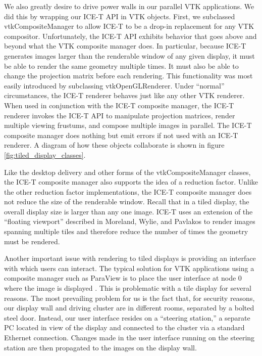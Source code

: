 \documentclass[twocolumn]{article}
\begin{document}
  We also greatly desire to drive power walls in our parallel VTK
  applications.  We did this by wrapping our ICE-T API in VTK objects.
  First, we subclassed vtkCompositeManager to allow ICE-T to be a drop-in
  replacement for any VTK compositor.  Unfortunately, the ICE-T API
  exhibits behavior that goes above and beyond what the VTK composite
  manager does.  In particular, because ICE-T generates images larger than
  the renderable window of any given display, it must be able to render the
  same geometry multiple times.  It must also be able to change the
  projection matrix before each rendering.  This functionality was most
  easily introduced by subclassing vtkOpenGLRenderer.  Under ``normal''
  circumstances, the ICE-T renderer behaves just like any other VTK
  renderer.  When used in conjunction with the ICE-T composite manager, the
  ICE-T renderer invokes the ICE-T API to manipulate projection matrices,
  render multiple viewing frustums, and compose multiple images in
  parallel.  The ICE-T composite manager does nothing but emit errors if
  not used with an ICE-T renderer.  A diagram of how these objects
  collaborate is shown in figure \vref{fig:tiled_display_classes}.

  Like the desktop delivery and other forms of the vtkCompositeManager
  classes, the ICE-T composite manager also supports the idea of a
  reduction factor.  Unlike the other reduction factor implementations, the
  ICE-T composite manager does not reduce the size of the renderable
  window.  Recall that in a tiled display, the overall display size is
  larger than any one image.  ICE-T uses an extension of the ``floating
  viewport'' described in Moreland, Wylie, and Pavlakos \cite{Moreland01}
  to render images spanning multiple tiles and therefore reduce the number
  of times the geometry must be rendered.

  Another important issue with rendering to tiled displays is providing an
  interface with which users can interact.  The typical solution for VTK
  applications using a composite manager such as ParaView is to place the
  user interface at node 0 where the image is displayed \cite{Law01}.  This
  is problematic with a tile display for several reasons.  The most
  prevailing problem for us is the fact that, for security reasons, our
  display wall and driving cluster are in different rooms, separated by a
  bolted steel door.  Instead, our user interface resides on a ``steering
  station,'' a separate PC located in view of the display and connected to
  the cluster via a standard Ethernet connection.  Changes made in the user
  interface running on the steering station are then propagated to the
  images on the display wall.
\end{document}
